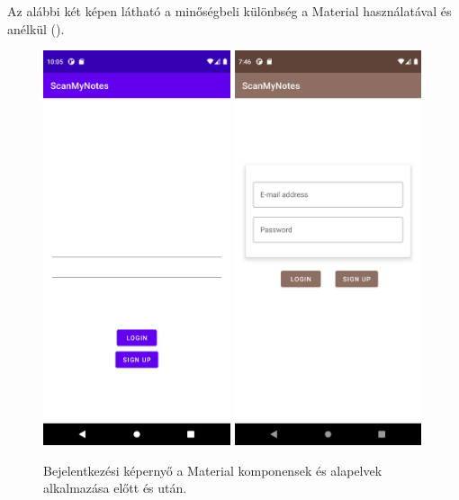 Az alábbi két képen látható a minőségbeli különbség a Material használatával és anélkül ().

\begin{figure}[!ht]
	\centering
	\includegraphics[width=55mm, keepaspectratio]{figures/login_screenshot_before.png}
	\includegraphics[width=55mm, keepaspectratio]{figures/login_screenshot_after.png}
	\caption{Bejelentkezési képernyő a Material komponensek és alapelvek alkalmazása előtt és után.}
	\label{fig:MaterialBeforeAfter}
\end{figure}

